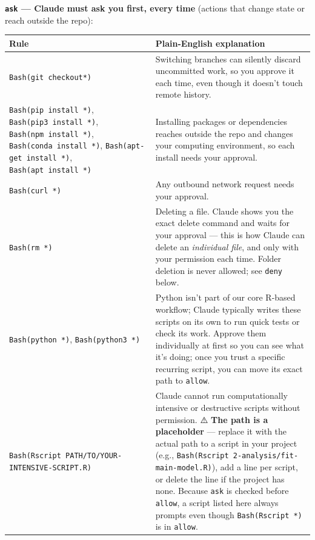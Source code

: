 \documentclass[
]{book}
\newcounter{none} %
\begin{document}
\textbf{\texttt{ask} --- Claude must ask you first, every time} (actions that change state or reach outside the repo):

{\def\LTcaptype{none} %
\begin{longtable}[]{@{}
  >{\raggedright\arraybackslash}p{}
  >{\raggedright\arraybackslash}p{}@{}}
\toprule\noalign{}
\begin{minipage}[b]{\linewidth}\raggedright
Rule
\end{minipage} & \begin{minipage}[b]{\linewidth}\raggedright
Plain-English explanation
\end{minipage} \\
\midrule\noalign{}
\endhead
\bottomrule\noalign{}
\endlastfoot
\texttt{Bash(git\ checkout*)} & Switching branches can silently discard uncommitted work, so you approve it each time, even though it doesn't touch remote history. \\
\texttt{Bash(pip\ install\ *)}, \texttt{Bash(pip3\ install\ *)}, \texttt{Bash(npm\ install\ *)}, \texttt{Bash(conda\ install\ *)}, \texttt{Bash(apt-get\ install\ *)}, \texttt{Bash(apt\ install\ *)} & Installing packages or dependencies reaches outside the repo and changes your computing environment, so each install needs your approval. \\
\texttt{Bash(curl\ *)} & Any outbound network request needs your approval. \\
\texttt{Bash(rm\ *)} & Deleting a file. Claude shows you the exact delete command and waits for your approval --- this is how Claude can delete an \emph{individual file}, and only with your permission each time. Folder deletion is never allowed; see \texttt{deny} below. \\
\texttt{Bash(python\ *)}, \texttt{Bash(python3\ *)} & Python isn't part of our core R-based workflow; Claude typically writes these scripts on its own to run quick tests or check its work. Approve them individually at first so you can see what it's doing; once you trust a specific recurring script, you can move its exact path to \texttt{allow}. \\
\texttt{Bash(Rscript\ PATH/TO/YOUR-INTENSIVE-SCRIPT.R)} & Claude cannot run computationally intensive or destructive scripts without permission. ⚠️ \textbf{The path is a placeholder} --- replace it with the actual path to a script in your project (e.g., \texttt{Bash(Rscript\ 2-analysis/fit-main-model.R)}), add a line per script, or delete the line if the project has none. Because \texttt{ask} is checked before \texttt{allow}, a script listed here always prompts even though \texttt{Bash(Rscript\ *)} is in \texttt{allow}. \\
\end{longtable}
}
\end{document}
